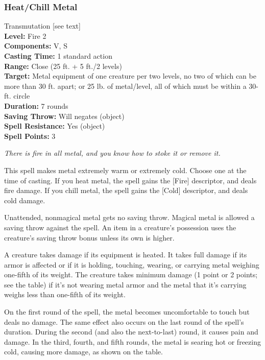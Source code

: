 \subsubsection{Heat/Chill Metal}
\label{Spell:HeatChillMetal}
Transmutation [see text]
\\ \textbf{Level:} Fire 2
\\ \textbf{Components:} V, S
\\ \textbf{Casting Time:} 1 standard action
\\ \textbf{Range:} Close (25 ft. + 5 ft./2 levels)
\\ \textbf{Target:} Metal equipment of one creature per two levels, no two of which can be more than 30 ft. apart; or 25 lb. of metal/level, all of which must be within a 30-ft. circle
\\ \textbf{Duration:} 7 rounds
\\ \textbf{Saving Throw:} Will negates (object)
\\ \textbf{Spell Resistance:} Yes (object)
\\ \textbf{Spell Points:} 3

\emph{There is fire in all metal, and you know how to stoke it or remove it.}

This spell makes metal extremely warm or extremely cold. 
Choose one at the time of casting.
If you heat metal, the spell gains the [Fire] descriptor, and deals fire damage.
If you chill metal, the spell gains the [Cold] descriptor, and deals cold damage.

Unattended, nonmagical metal gets no saving throw. 
Magical metal is allowed a saving throw against the spell. 
An item in a creature's possession uses the creature's saving throw bonus unless its own is higher.

A creature takes damage if its equipment is heated. 
It takes full damage if its armor is affected or if it is holding, touching, wearing, or carrying metal weighing one-fifth of its weight. The creature takes minimum damage (1 point or 2 points; see the table) if it's not wearing metal armor and the metal that it's carrying weighs less than one-fifth of its weight.

On the first round of the spell, the metal becomes uncomfortable to touch but deals no damage. The same effect also occurs on the last round of the spell's duration. During the second (and also the next-to-last) round, it causes pain and damage. In the third, fourth, and fifth rounds, the metal is searing hot or freezing cold, causing more damage, as shown on the table.

